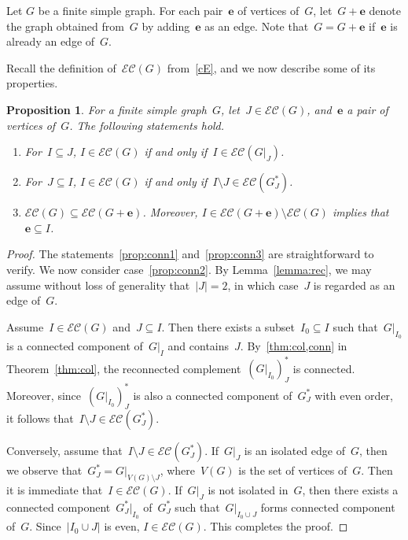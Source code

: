\documentclass[10pt]{amsart}
\theoremstyle{plain}
\newtheorem{proposition}[theorem]{Proposition}
\numberwithin{equation}{section}
\theoremstyle{definition}
\newcommand{\edge}{\mathbf{e}}
\newcommand{\EC}{\mathcal{E}\mathcal{C}}
\begin{document}
Let $G$ be a finite simple graph.
For each pair~$\edge$ of vertices of~$G$, let~$G + \edge$ denote the graph obtained from~$G$ by adding~$\edge$ as an edge.
Note that~$G = G +\edge$ if~$\edge$ is already an edge of~$G$.

Recall the definition of~$\EC(G)$ from~\eqref{cE}, and we now describe some of its properties.

\begin{proposition}\label{prop:conn}
    For a finite simple graph~$G$, let~$J \in \EC(G)$, and~$\edge$ a pair of vertices of~$G$.
    The following statements hold.
    \begin{enumerate}
      \item\label{prop:conn1} For~$I \subseteq J$, $I \in \EC(G)$ if and only if~$I \in \EC(G\vert_J)$. 
      \item\label{prop:conn2} For~$J \subseteq I$, $I \in \EC(G)$ if and only if~$I \setminus J \in \EC(G^\ast_J)$.
      \item\label{prop:conn3} $\EC(G) \subseteq \EC(G+\edge)$.
    Moreover, $I \in \EC(G+\edge) \setminus \EC(G)$ implies that $\edge \subseteq I$.
    \end{enumerate}
\end{proposition}
\begin{proof}
The statements~\eqref{prop:conn1} and~\eqref{prop:conn3} are straightforward to verify.
We now consider case~\eqref{prop:conn2}.
By Lemma~\ref{lemma:rec}, we may assume without loss of generality that~$|J|=2$, in which case~$J$ is regarded as an edge of~$G$.

Assume~$I \in \EC(G)$ and~$J \subseteq I$.
Then there exists a subset~$I_0 \subseteq I$ such that~$G\vert_{I_0}$ is a connected component of~$G\vert_{I}$ and contains~$J$.
By~\eqref{thm:col,conn} in Theorem~\ref{thm:col}, the reconnected complement~$(G\vert_{I_0})^\ast_J$ is connected.
Moreover, since~$(G\vert_{I_0})^\ast_J$ is also a connected component of~$G^\ast_J$ with even order, it follows that~$I \setminus J \in \EC(G^\ast_J)$.

Conversely, assume that~$I \setminus J \in \EC(G^\ast_J)$.
If~$G\vert_{J}$ is an isolated edge of~$G$, then we observe that~$G^\ast_J = G\vert_{V(G) \setminus J}$, where~$V(G)$ is the set of vertices of~$G$.
Then it is immediate that~$I \in \EC(G)$.
If~$G\vert_J$ is not isolated in~$G$, then there exists a connected component~$G^\ast_J\vert_{I_0}$ of~$G^\ast_J$ such that~$G\vert_{I_0 \cup J}$ forms connected component of~$G$.
Since~$|I_0 \cup J|$ is even, $I \in \EC(G)$.
This completes the proof.
\end{proof}
\end{document}
